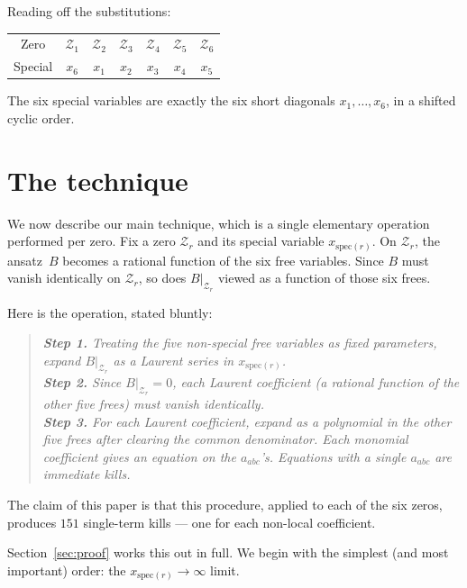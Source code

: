 \documentclass[11pt]{article}
\newcommand{\Z}{\mathcal{Z}}
\newcommand{\spec}{\mathrm{spec}}
\theoremstyle{definition}
\begin{document}
Reading off the substitutions:
\begin{center}
\begin{tabular}{ccccccc}
\toprule
Zero & $\Z_1$ & $\Z_2$ & $\Z_3$ & $\Z_4$ & $\Z_5$ & $\Z_6$ \\
Special & $x_6$ & $x_1$ & $x_2$ & $x_3$ & $x_4$ & $x_5$ \\
\bottomrule
\end{tabular}
\end{center}

The six special variables are exactly the six short diagonals $x_1,\dots,x_6$,
in a shifted cyclic order.

\section{The technique}
\label{sec:technique}

We now describe our main technique, which is a single elementary operation
performed per zero. Fix a zero $\Z_r$ and its special variable
$x_{\spec(r)}$. On $\Z_r$, the ansatz~$B$ becomes a rational function of the
six free variables. Since $B$ must vanish identically on $\Z_r$, so does
$B|_{\Z_r}$ viewed as a function of those six frees.

Here is the operation, stated bluntly:

\begin{quote}\em
\textbf{Step 1.} Treating the five non-special free variables as fixed
parameters, expand $B|_{\Z_r}$ as a Laurent series in $x_{\spec(r)}$.\\[3pt]
\textbf{Step 2.} Since $B|_{\Z_r}=0$, each Laurent coefficient (a rational
function of the other five frees) must vanish identically.\\[3pt]
\textbf{Step 3.} For each Laurent coefficient, expand as a polynomial in the
other five frees after clearing the common denominator. Each monomial
coefficient gives an equation on the $a_{abc}$'s. Equations with a single
$a_{abc}$ are immediate kills.
\end{quote}

The claim of this paper is that this procedure, applied to each of the six
zeros, produces $151$ single-term kills --- one for each non-local coefficient.

Section~\ref{sec:proof} works this out in full. We begin with the simplest
(and most important) order: the $x_{\spec(r)}\to\infty$ limit.

\end{document}
